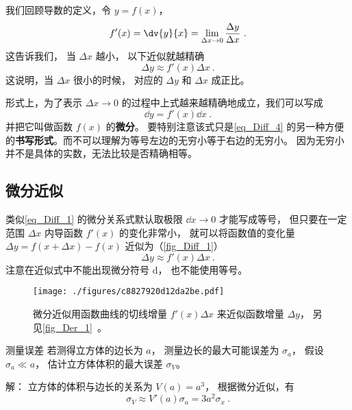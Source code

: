 
我们回顾导数的定义，令 $y = f(x)$，
\begin{equation}\label{eq_Diff_4}
f'(x) = \dv{y}{x} = \lim_{\Delta x\to 0} \frac{\Delta y}{\Delta x}~.
\end{equation}
这告诉我们， 当 $\Delta x$ 越小， 以下近似就越精确
\begin{equation}\label{eq_Diff_3}
\Delta y \approx f'(x) \Delta x~.
\end{equation}
这说明，当 $\Delta x$ 很小的时候， 对应的 $\Delta y$ 和 $\Delta x$ 成正比。

形式上，为了表示 $\Delta x\to 0$ 的过程中上式越来越精确地成立，我们可以写成
\begin{equation}\label{eq_Diff_1}
\dd{y} = f'(x)\dd{x}~.
\end{equation}
并把它叫做函数 $f(x)$ 的\textbf{微分}。 要特别注意该式只是\autoref{eq_Diff_4} 的另一种方便的\textbf{书写形式}。而不可以理解为等号左边的无穷小等于右边的无穷小。 因为无穷小并不是具体的实数，无法比较是否精确相等。

\subsection{微分近似}\label{sub_Diff_1}
类似\autoref{eq_Diff_1} 的微分关系式默认取极限 $\dd{x} \to 0$ 才能写成等号， 但只要在一定范围 $\Delta x$ 内导函数 $f'(x)$ 的变化非常小， 就可以将函数值的变化量 $\Delta y = f(x+\Delta x)-f(x)$ 近似为（\autoref{fig_Diff_1}）
\begin{equation}\label{eq_Diff_2}
\Delta y \approx f'(x) \Delta x~.
\end{equation}
注意在近似式中不能出现微分符号 $\mathrm{d}$， 也不能使用等号。

\begin{figure}[ht]
\centering
\texttt{[image: ./figures/c8827920d12da2be.pdf]}
\caption{微分近似用函数曲线的切线增量 $f'(x)\Delta x$ 来近似函数增量 $\Delta y$， 另见\autoref{fig_Der_1}~。} \label{fig_Diff_1}
\end{figure}

\begin{example}{测量误差}\label{ex_Diff_1}
若测得立方体的边长为 $a$， 测量边长的最大可能误差为 $\sigma_a$， 假设 $\sigma_a \ll a$， 估计立方体体积的最大误差 $\sigma_V$。

解： 立方体的体积与边长的关系为 $V(a)=a^3$， 根据微分近似，有
\begin{equation}
\sigma_V \approx V'(a) \sigma_a = 3a^2 \sigma_x~.
\end{equation}
\end{example}

